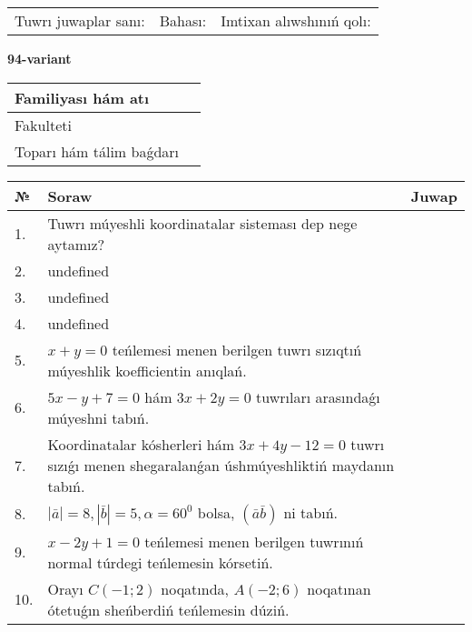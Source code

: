 \documentclass{article}
\begin{document}
\vspace{0.7cm}

\begin{tabular}{lll}
Tuwrı juwaplar sanı: \underline{\hspace{1cm}} & 
Bahası: \underline{\hspace{1cm}} & 
Imtixan alıwshınıń qolı: \underline{\hspace{2cm}} \\
\end{tabular}

\egroup

\newpage


\textbf{94-variant}\\

\bgroup
\def\arraystretch{1.6} %

\begin{tabular}{|m{5.7cm}|m{9.5cm}|}
\hline
Familiyası hám atı & \\
\hline
Fakulteti  & \\
\hline
Toparı hám tálim baǵdarı  & \\
\hline
\end{tabular}

\vspace{0.7cm}

\begin{tabular}{|m{0.7cm}|m{10cm}|m{4cm}|}
\hline
№ & Soraw & Juwap \\
\hline
1. & Tuwrı múyeshli koordinatalar sisteması dep nege aytamız? &  \\
\hline
2. & undefined &  \\
\hline
3. & undefined &  \\
\hline
4. & undefined &  \\
\hline
5. & \(x + y = 0\) teńlemesi menen berilgen tuwrı sızıqtıń múyeshlik koefficientin anıqlań. &  \\
\hline
6. & \(5 x - y + 7 = 0\) hám \(3 x + 2 y = 0\) tuwrıları arasındaǵı múyeshni tabıń. &  \\
\hline
7. & Koordinatalar kósherleri hám \( 3 x + 4 y - 12 = 0 \) tuwrı sızıǵı menen shegaralanǵan úshmúyeshliktiń maydanın tabıń. &  \\
\hline
8. & \(\left| \bar{a} \right| = 8, \left| \bar{b} \right| = 5, \alpha = 60^{0}\) bolsa, \(( \bar{a}\bar{b} )\) ni tabıń. &  \\
\hline
9. & \(x - 2 y + 1 = 0\) teńlemesi menen berilgen tuwrınıń normal túrdegi teńlemesin kórsetiń. &  \\
\hline
10. & Orayı \(C (- 1;2)\) noqatında, \(A (- 2;6 )\) noqatınan ótetuǵın sheńberdiń teńlemesin dúziń. & \\
\hline
\end{tabular}
\end{document}
